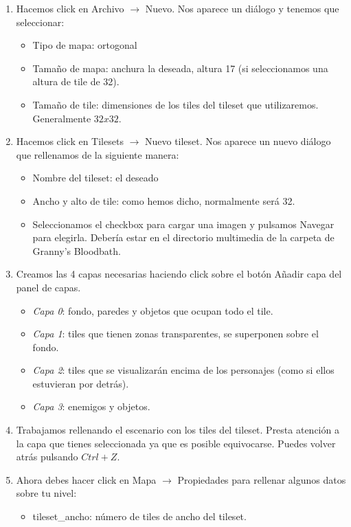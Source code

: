 \begin{enumerate}
	\item Hacemos click en Archivo $\rightarrow$ Nuevo. Nos aparece un diálogo
	y tenemos que seleccionar:
	\begin{itemize}
		\item Tipo de mapa: ortogonal
		\item Tamaño de mapa: anchura la deseada, altura 17 (si
		seleccionamos una altura de tile de 32).
		\item Tamaño de tile: dimensiones de los tiles del tileset
		que utilizaremos. Generalmente $32x32$.
	\end{itemize}
	\item Hacemos click en Tilesets $\rightarrow$ Nuevo tileset. Nos aparece
	un nuevo diálogo que rellenamos de la siguiente manera:
	\begin{itemize}
		\item Nombre del tileset: el deseado
		\item Ancho y alto de tile: como hemos dicho, normalmente
		será 32.
		\item Seleccionamos el checkbox para cargar una imagen y
		pulsamos Navegar para elegirla. Debería estar en el directorio
		multimedia de la carpeta de Granny's Bloodbath.
	\end{itemize}
	\item Creamos las 4 capas necesarias haciendo click sobre el botón
	Añadir capa del panel de capas.
	\begin{itemize}
		\item \emph{Capa 0}: fondo, paredes y objetos que ocupan
		todo el tile.
		\item \emph{Capa 1}: tiles que tienen zonas transparentes,
		se superponen sobre el fondo.
		\item \emph{Capa 2}: tiles que se visualizarán encima de los
		personajes (como si ellos estuvieran por detrás).
		\item \emph{Capa 3}: enemigos y objetos.
	\end{itemize}
	\item Trabajamos rellenando el escenario con los tiles del tileset.
	Presta atención a la capa que tienes seleccionada ya que es posible
	equivocarse. Puedes volver atrás pulsando $Ctrl+Z$.
	\item Ahora debes hacer click en Mapa $\rightarrow$ Propiedades para
	rellenar algunos datos sobre tu nivel:
	\begin{itemize}
		\item tileset\_ancho: número de tiles de ancho del tileset.

\end{itemize}
\end{enumerate}
